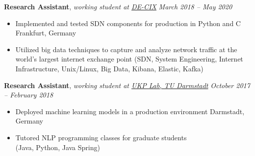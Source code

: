 \documentclass[9pt]{extarticle}
\begin{document}
\noindent
{\bf Research Assistant}, \textit{working student at \href{https://www.de-cix.net/}{DE-CIX}}   \hfill \textit{March 2018 -- May 2020}
\begin{itemize}
\setlength\itemsep{0.05em}
\item Implemented and tested SDN components for production in Python and C \hfill Frankfurt, Germany
\item Utilized big data techniques to capture and analyze network traffic at the world's largest internet exchange point
(SDN, System Engineering, Internet Infrastructure, Unix/Linux, Big Data, Kibana, Elastic, Kafka) \\
\end{itemize}

\noindent
{\bf Research Assistant}, \textit{working student at \href{https://www.informatik.tu-darmstadt.de/ukp/ukp_home/index.en.jsp}{UKP Lab, TU Darmstadt}}  \hfill \textit{October 2017 -- February 2018}
\begin{itemize}
\setlength\itemsep{0.05em}
    \item Deployed machine learning models in a production environment \hfill Darmstadt, Germany
    \item Tutored NLP programming classes for graduate students \\
    (Java, Python, Java Spring) \\
\end{itemize}
\end{document}
